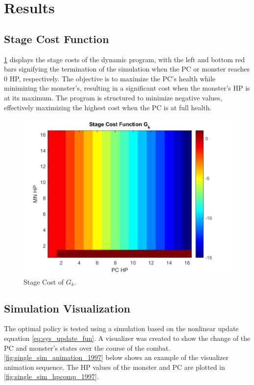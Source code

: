 \documentclass[letterpaper, 10 pt, conference]{ieeeconf}
\begin{document}
\section{Results}
\subsection{Stage Cost Function}
\cref{fig:G_k_vis} displays the stage costs of the dynamic program, with the left and bottom red bars signifying the termination of the simulation when the PC or monster reaches 0 HP, respectively. 
The objective is to maximize the PC's health while minimizing the monster's, resulting in a significant cost when the monster's HP is at its maximum. 
The program is structured to minimize negative values, effectively maximizing the highest cost when the PC is at full health.

\begin{figure}[thb]
    \centering
    \includegraphics[scale =0.44]{figs/DND_StageCost_G_k.png}
    \caption{Stage Cost of $G_k$.}
    \label{fig:G_k_vis}
\end{figure}

\subsection{Simulation Visualization}
The optimal policy is tested using a simulation based on the nonlinear update equation \eqref{eq:sys_update_fun}.
A visualizer was created to show the change of the PC and monster's states over the course of the combat. 
\cref{fig:single_sim_animation_1997} below shows an example of the visualizer animation sequence. 
The HP values of the monster and PC are plotted in \cref{fig:single_sim_hpcomp_1997}.
\end{document}
